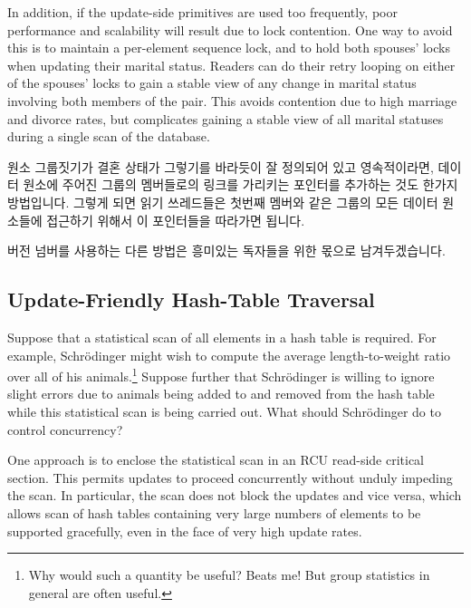 In addition, if the update-side primitives are used too frequently,
poor performance and scalability will result due to lock contention.
One way to avoid this is to maintain a per-element sequence lock,
and to hold both spouses' locks when updating their marital status.
Readers can do their retry looping on either of the spouses' locks
to gain a stable view of any change in marital status involving both
members of the pair.
This avoids contention due to high marriage and divorce rates, but
complicates gaining a stable view of all marital statuses during a
single scan of the database.
\fi

원소 그룹짓기가 결혼 상태가 그렇기를 바라듯이 잘 정의되어 있고 영속적이라면,
데이터 원소에 주어진 그룹의 멤버들로의 링크를 가리키는 포인터를 추가하는 것도
한가지 방법입니다.
그렇게 되면 읽기 쓰레드들은 첫번째 멤버와 같은 그룹의 모든 데이터 원소들에
접근하기 위해서 이 포인터들을 따라가면 됩니다.

버전 넘버를 사용하는 다른 방법은 흥미있는 독자들을 위한 몫으로 남겨두겠습니다.
\iffalse

If the element groupings are well-defined and persistent, which marital
status is hoped to be,
then one approach is to add pointers to the data elements to link
together the members of a given group.
Readers can then traverse these pointers to access all the data elements
in the same group as the first one located.

Other approaches using version numbering are left as exercises for the
interested reader.
\fi

\subsection{Update-Friendly Hash-Table Traversal}
\label{sec:together:Update-Friendly Hash-Table Traversal}

Suppose that a statistical scan of all elements in a hash table is
required.
For example, Schr\"odinger might wish to compute the average
length-to-weight ratio over all of his animals.\footnote{
	Why would such a quantity be useful?
	Beats me!
	But group statistics in general are often useful.}
Suppose further that Schr\"odinger is willing to ignore slight
errors due to animals being added to and removed from the hash
table while this statistical scan is being carried out.
What should Schr\"odinger do to control concurrency?

One approach is to enclose the statistical scan in an RCU read-side
critical section.
This permits updates to proceed concurrently without unduly impeding
the scan.
In particular, the scan does not block the updates and vice versa,
which allows scan of hash tables containing very large numbers of
elements to be supported gracefully, even in the face of very high
update rates.

